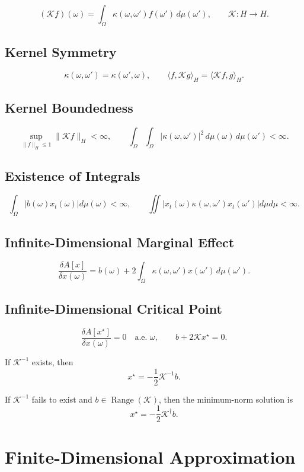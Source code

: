 \documentclass[11pt]{article}
\begin{document}
\[
(\mathcal K f)(\omega)
=
\int_{\Omega}
\kappa(\omega,\omega')f(\omega')\,d\mu(\omega'),
\qquad
\mathcal K:H\to H.
\]

\subsection{Kernel Symmetry}

\[
\kappa(\omega,\omega')=\kappa(\omega',\omega),
\qquad
\langle f,\mathcal K g\rangle_H
=
\langle \mathcal K f,g\rangle_H.
\]

\subsection{Kernel Boundedness}

\[
\sup_{\|f\|_H\leq 1}\|\mathcal K f\|_H<\infty,
\qquad
\int_{\Omega}\int_{\Omega}
|\kappa(\omega,\omega')|^2
\,d\mu(\omega)\,d\mu(\omega')
<\infty.
\]

\subsection{Existence of Integrals}
\[
\int_\Omega |b(\omega)x_t(\omega)|d\mu(\omega)<\infty,
\qquad \iint|x_t(\omega)\kappa(\omega,\omega')x_t(\omega')|d\mu d\mu<\infty.
\]

\subsection{Infinite-Dimensional Marginal Effect}

\[
\frac{\delta A[x]}{\delta x(\omega)}
=
b(\omega)
+
2\int_{\Omega}
\kappa(\omega,\omega')x(\omega')\,d\mu(\omega').
\]

\subsection{Infinite-Dimensional Critical Point}

\[
\frac{\delta A[x^\star]}{\delta x(\omega)}
=
0
\quad \text{a.e. } \omega,
\qquad
b+2\mathcal Kx^\star=0.
\]

If \(\mathcal K^{-1}\) exists, then
\[
x^\star=-\frac12\mathcal K^{-1}b.
\]

If \(\mathcal K^{-1}\) fails to exist and \(b\in\operatorname{Range}(\mathcal K)\), then the minimum-norm solution is
\[
x^\star=-\frac12\mathcal K^\dagger b.
\]

\section{Finite-Dimensional Approximation}
\end{document}
